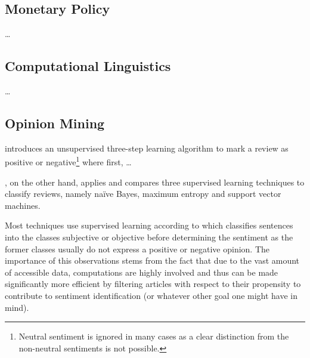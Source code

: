
\subsection{Monetary Policy}

\dots

\subsection{Computational Linguistics}

\dots


\subsection{Opinion Mining}

\textcite{Turney.2002} introduces an unsupervised three-step learning algorithm to mark a review as positive or negative\footnote{Neutral sentiment is ignored in many cases as a clear distinction from the non-neutral sentiments is not possible.} where first, \dots

\textcite{Pang.2002}, on the other hand, applies and compares three supervised learning techniques to classify reviews, namely na\"{i}ve Bayes, maximum entropy and support vector machines. 


Most techniques use supervised learning according to \textcite{Wiebe.1999} which classifies sentences into the classes subjective or objective before determining the sentiment as the former classes usually do not express a positive or negative opinion. The importance of this observations stems from the fact that due to the vast amount of accessible data, computations are highly involved and thus can be made significantly more efficient by filtering articles with respect to their propensity to contribute to sentiment identification (or whatever other goal one might have in mind). 


